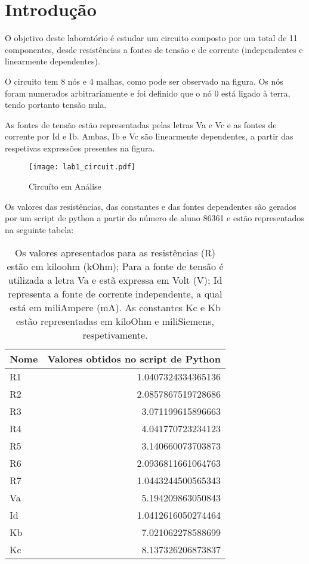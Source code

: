 \section{Introdução}
\label{sec:introdução}

\par O objetivo deste laboratório é estudar um circuito composto por um total de 11 componentes, desde resistências a fontes de tensão e de corrente (independentes e linearmente dependentes). \par
O circuito tem 8 nós e 4 malhas, como pode ser observado na figura. Os nós foram numerados arbitrariamente e foi definido que o nó 0 está ligado à terra, tendo portanto tensão nula.\par
As fontes de tensão estão representadas pelas letras Va e Vc e as fontes de corrente por Id e Ib. Ambas, Ib e Vc são linearmente dependentes, a partir das respetivas expressões presentes na figura.

\begin{figure}[h] \centering
\texttt{[image: lab1\_circuit.pdf]}
\caption{Circuíto em Análise}
\label{fig:lab1_circuit}
\end{figure}

Os valores das resistências, das constantes e das fontes dependentes são gerados por um script de python a partir do número de aluno 86361 e estão representados na seguinte tabela:

\begin{table}[h]
  \centering
  \begin{tabular}{|l|r|}
    \hline    
    {\bf Nome} & {\bf Valores obtidos no script de Python} \\ \hline
	R1 &  1.0407324334365136\\ \hline
	R2 &  2.0857867519728686\\ \hline
	R3 &  3.071199615896663  \\ \hline
	R4 &  4.041770723234123 \\ \hline
	R5 &  3.140660073703873\\ \hline
	R6 &  2.0936811661064763 \\ \hline
	R7 &  1.0443244500565343  \\ \hline
	Va &  5.194209863050843 \\ \hline
	Id &  1.0412616050274464 \\ \hline
	Kb &  7.021062278588699\\ \hline
	Kc &  8.137326206873837\\ 
	\hline

  \end{tabular}
  \caption{Os valores apresentados para as resistências (R) estão em kiloohm (kOhm); Para a fonte de tensão é utilizada a letra Va e estã expressa em Volt (V); Id representa a fonte de corrente independente, a qual está em  miliAmpere (mA). As constantes Kc e Kb estão representadas em kiloOhm e miliSiemens, respetivamente.}
  \label{tab:python_values}
\end{table}

